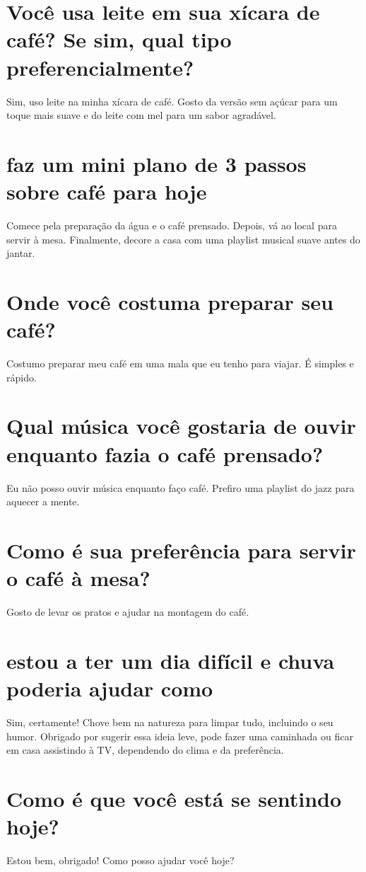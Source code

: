 \documentclass[11pt,a4paper]{article}
\begin{document}
\section{Você usa leite em sua xícara de café? Se sim, qual tipo preferencialmente?}
Sim, uso leite na minha xícara de café. Gosto da versão sem açúcar para um toque mais suave e do leite com mel para um sabor agradável.

\section{faz um mini plano de 3 passos sobre café para hoje}
Comece pela preparação da água e o café prensado. Depois, vá ao local para servir à mesa. Finalmente, decore a casa com uma playlist musical suave antes do jantar.

\section{Onde você costuma preparar seu café?}
Costumo preparar meu café em uma mala que eu tenho para viajar. É simples e rápido.

\section{Qual música você gostaria de ouvir enquanto fazia o café prensado?}
Eu não posso ouvir música enquanto faço café. Prefiro uma playlist do jazz para aquecer a mente.

\section{Como é sua preferência para servir o café à mesa?}
Gosto de levar os pratos e ajudar na montagem do café.

\section{estou a ter um dia difícil e chuva poderia ajudar como}
Sim, certamente! Chove bem na natureza para limpar tudo, incluindo o seu humor. Obrigado por sugerir essa ideia leve, pode fazer uma caminhada ou ficar em casa assistindo à TV, dependendo do clima e da preferência.

\section{Como é que você está se sentindo hoje?}
Estou bem, obrigado! Como posso ajudar você hoje?
\end{document}
